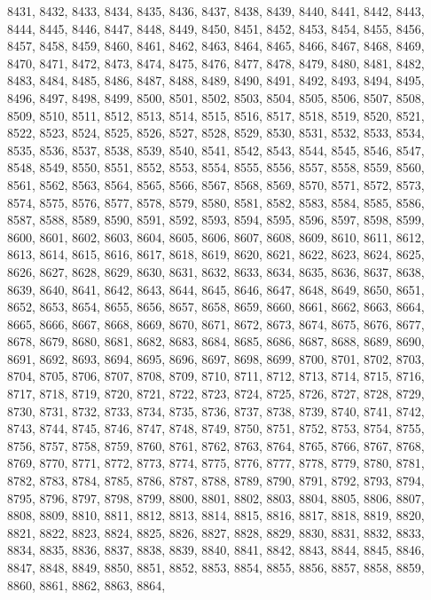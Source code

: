 8431,
8432,
8433,
8434,
8435,
8436,
8437,
8438,
8439,
8440,
8441,
8442,
8443,
8444,
8445,
8446,
8447,
8448,
8449,
8450,
8451,
8452,
8453,
8454,
8455,
8456,
8457,
8458,
8459,
8460,
8461,
8462,
8463,
8464,
8465,
8466,
8467,
8468,
8469,
8470,
8471,
8472,
8473,
8474,
8475,
8476,
8477,
8478,
8479,
8480,
8481,
8482,
8483,
8484,
8485,
8486,
8487,
8488,
8489,
8490,
8491,
8492,
8493,
8494,
8495,
8496,
8497,
8498,
8499,
8500,
8501,
8502,
8503,
8504,
8505,
8506,
8507,
8508,
8509,
8510,
8511,
8512,
8513,
8514,
8515,
8516,
8517,
8518,
8519,
8520,
8521,
8522,
8523,
8524,
8525,
8526,
8527,
8528,
8529,
8530,
8531,
8532,
8533,
8534,
8535,
8536,
8537,
8538,
8539,
8540,
8541,
8542,
8543,
8544,
8545,
8546,
8547,
8548,
8549,
8550,
8551,
8552,
8553,
8554,
8555,
8556,
8557,
8558,
8559,
8560,
8561,
8562,
8563,
8564,
8565,
8566,
8567,
8568,
8569,
8570,
8571,
8572,
8573,
8574,
8575,
8576,
8577,
8578,
8579,
8580,
8581,
8582,
8583,
8584,
8585,
8586,
8587,
8588,
8589,
8590,
8591,
8592,
8593,
8594,
8595,
8596,
8597,
8598,
8599,
8600,
8601,
8602,
8603,
8604,
8605,
8606,
8607,
8608,
8609,
8610,
8611,
8612,
8613,
8614,
8615,
8616,
8617,
8618,
8619,
8620,
8621,
8622,
8623,
8624,
8625,
8626,
8627,
8628,
8629,
8630,
8631,
8632,
8633,
8634,
8635,
8636,
8637,
8638,
8639,
8640,
8641,
8642,
8643,
8644,
8645,
8646,
8647,
8648,
8649,
8650,
8651,
8652,
8653,
8654,
8655,
8656,
8657,
8658,
8659,
8660,
8661,
8662,
8663,
8664,
8665,
8666,
8667,
8668,
8669,
8670,
8671,
8672,
8673,
8674,
8675,
8676,
8677,
8678,
8679,
8680,
8681,
8682,
8683,
8684,
8685,
8686,
8687,
8688,
8689,
8690,
8691,
8692,
8693,
8694,
8695,
8696,
8697,
8698,
8699,
8700,
8701,
8702,
8703,
8704,
8705,
8706,
8707,
8708,
8709,
8710,
8711,
8712,
8713,
8714,
8715,
8716,
8717,
8718,
8719,
8720,
8721,
8722,
8723,
8724,
8725,
8726,
8727,
8728,
8729,
8730,
8731,
8732,
8733,
8734,
8735,
8736,
8737,
8738,
8739,
8740,
8741,
8742,
8743,
8744,
8745,
8746,
8747,
8748,
8749,
8750,
8751,
8752,
8753,
8754,
8755,
8756,
8757,
8758,
8759,
8760,
8761,
8762,
8763,
8764,
8765,
8766,
8767,
8768,
8769,
8770,
8771,
8772,
8773,
8774,
8775,
8776,
8777,
8778,
8779,
8780,
8781,
8782,
8783,
8784,
8785,
8786,
8787,
8788,
8789,
8790,
8791,
8792,
8793,
8794,
8795,
8796,
8797,
8798,
8799,
8800,
8801,
8802,
8803,
8804,
8805,
8806,
8807,
8808,
8809,
8810,
8811,
8812,
8813,
8814,
8815,
8816,
8817,
8818,
8819,
8820,
8821,
8822,
8823,
8824,
8825,
8826,
8827,
8828,
8829,
8830,
8831,
8832,
8833,
8834,
8835,
8836,
8837,
8838,
8839,
8840,
8841,
8842,
8843,
8844,
8845,
8846,
8847,
8848,
8849,
8850,
8851,
8852,
8853,
8854,
8855,
8856,
8857,
8858,
8859,
8860,
8861,
8862,
8863,
8864,
